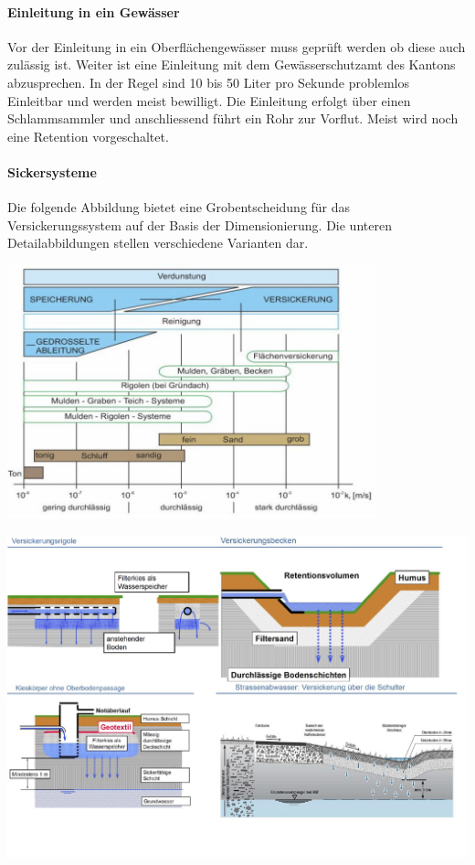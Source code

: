 \documentclass[9pt, openright=false]{scrartcl}
\begin{document}
\paragraph{Einleitung in ein Gewässer} Vor der Einleitung in ein Oberflächengewässer muss geprüft werden ob diese auch zulässig ist. Weiter ist eine Einleitung mit dem Gewässerschutzamt des Kantons abzusprechen. In der Regel sind 10 bis 50 Liter pro Sekunde problemlos Einleitbar und werden meist bewilligt. Die Einleitung erfolgt über einen Schlammsammler und anschliessend führt ein Rohr zur Vorflut. Meist wird noch eine Retention vorgeschaltet.
\paragraph{Sickersysteme} Die folgende Abbildung bietet eine Grobentscheidung für das Versickerungssystem auf der Basis der Dimensionierung. Die unteren Detailabbildungen stellen verschiedene Varianten dar.
\begin{center}
\includegraphics[width=0.8\textwidth]{images/sys}
\end{center}
\begin{center}
\includegraphics[width=\textwidth]{images/versick}
\end{center}
\end{document}
